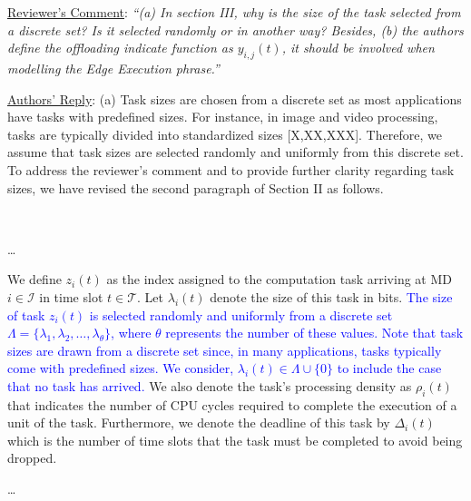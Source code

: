 \documentclass[12pt,draftclsnofoot,onecolumn]{IEEEtran}
\newcommand{\rev}[1]{{\color{blue}#1}} %
\newcommand{\rev}[1]{#1}
\newenvironment{my}[2]%
{\begin{list}{}%
{\setlength{\rightmargin}{#1}\setlength{\leftmargin}{#2}}%


 \item[]{}

} {\end{list}}
\begin{document}
\begin{enumerate}
\vspace{6mm}

\item \underline{Reviewer's Comment}: 
\textit{``(a) In section III, why is the size of the task selected from a discrete set? Is it selected randomly or in another way? Besides, (b) the authors define the offloading indicate function as $y_{i,j}(t)$, it should be involved when modelling the Edge Execution phrase.''} \newline

\underline{Authors' Reply}: (a) Task sizes are chosen from a discrete set as most applications have tasks with predefined sizes. For instance, in image and video processing, tasks are typically divided into standardized sizes [X,XX,XXX]. Therefore, we assume that task sizes are selected randomly and uniformly from this discrete set. To address the reviewer’s comment and to provide further clarity regarding task sizes, we have revised the second paragraph of Section II as follows.


		\begin{my}{1cm}{1cm}
	\rev{
		{\
			
			 \dots

\color{black}
We define $z_i(t)$ as the index assigned to the computation task arriving at MD $i \in \mathcal{I}$ in time slot $t \in \mathcal{T}$. Let $\lambda_i(t)$ denote the size of this task in bits. \textcolor{blue}{The size of task \( z_i(t) \) is selected randomly and uniformly from a discrete set \( \Lambda = \{\lambda_1, \lambda_2, \ldots, \lambda_{\theta}\} \), where \( \theta \) represents the number of these values. Note that task sizes are drawn from a discrete set since, in many applications, tasks typically come with predefined sizes. We consider, $\lambda_i(t) \in \Lambda \cup \{0\}$ to include the case that no task has arrived.} We also denote the task's processing density as $\rho_i(t)$ that indicates the number of CPU cycles required to complete the execution of a unit of the task. Furthermore, we denote the deadline of this task by $\Delta_i(t)$ which is the number of time slots that the task must be completed to avoid being dropped.

\dots




}}
\end{my}
\end{enumerate}
\end{document}
